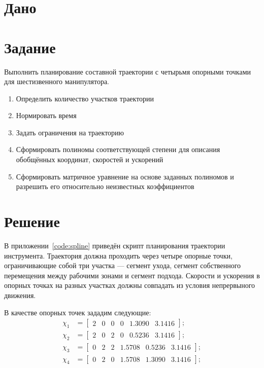 \documentclass[14pt]{extarticle}
\begin{document}
    

    \section*{Дано}

    \section*{Задание}
    Выполнить планирование составной траектории с четырьмя опорными точками для шестизвенного манипулятора.
    \begin{enumerate}
        \item Определить количество участков траектории
        \item Нормировать время
        \item Задать ограничения на траекторию
        \item Сформировать полиномы соответствующей степени для описания обобщённых координат, скоростей и ускорений
        \item Сформировать матричное уравнение на основе заданных полиномов и разрешить его относительно неизвестных коэффициентов
    \end{enumerate}

    \section*{Решение}
    В приложении~\ref{code:spline} приведён скрипт планирования траектории инструмента. Траектория должна проходить через четыре
    опорные точки, ограничивающие собой три участка --- сегмент ухода, сегмент собственного перемещения между рабочими зонами
    и сегмент подхода. Скорости и ускорения в опорных точках на разных участках должны совпадать из условия непрервыного
    движения.

    В качестве опорных точек зададим следующие:
    \begin{equation}
        \begin{aligned}
            \chi_1& =
            \begin{bmatrix}
                2 & 0 & 0 & 0 & 1.3090 & 3.1416
            \end{bmatrix};\\
            \chi_2& =
            \begin{bmatrix}
                2 & 0 & 2 & 0 & 0.5236 & 3.1416
            \end{bmatrix};\\
            \chi_3& =
            \begin{bmatrix}
                0 & 2 & 2 & 1.5708 & 0.5236 & 3.1416
            \end{bmatrix};\\
            \chi_4& =
            \begin{bmatrix}
                0 & 2 & 0 & 1.5708 & 1.3090 & 3.1416
            \end{bmatrix};
        \end{aligned}
    \end{equation}
\end{document}
